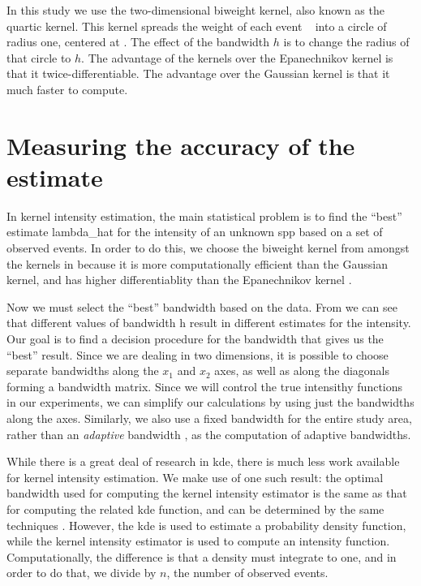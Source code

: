 In this study we use the two-dimensional biweight kernel,
also known as the quartic kernel.
This kernel spreads the weight of each event \xvec~ into a circle of radius one, centered at \xvec.
The effect of the bandwidth $h$ is to change the radius of that circle to $h$.
The advantage of the kernels over the Epanechnikov kernel is that it twice-differentiable.
The advantage over the Gaussian kernel is that it much faster to compute.

\section{Measuring the accuracy of the estimate}
\label{sec:theory:accuracy}

In \gls{kernel intensity estimation},
the main statistical problem is to find the ``best'' estimate \gls{lambda_hat}
for the \gls{intensity} of an unknown \gls{spp}
based on a set of observed \glspl{event}.
In order to do this,
we choose the biweight kernel from amongst the kernels in  because it is more computationally efficient than the Gaussian kernel,
and has higher differentiablity than the Epanechnikov kernel \citep[p. 77]{silverman1986density}.

Now we must select the ``best'' bandwidth \citep[p. 43]{silverman1986density} based on the data.
From  we can see that different values of bandwidth \gls{h} result in different estimates for the \gls{intensity}.
Our goal is to find a decision procedure for the bandwidth that gives us the ``best'' result.
Since we are dealing in two dimensions,
it is possible to choose separate bandwidths along the $x_1$ and $x_2$ axes,
as well as along the diagonals forming a bandwidth matrix.
Since we will control the true intensithy functions in our experiments,
we can simplify our calculations by using just the bandwidths along the axes.
Similarly, we also use a fixed bandwidth for the entire study area,
rather than an \textit{adaptive} bandwidth \citep{breiman1977variable},
as the computation of adaptive bandwidths.

While there is a great deal of research in \gls{kde},
there is much less work available for \gls{kernel intensity estimation}.
We make use of one such result:
the optimal bandwidth used for computing the \gls{kernel intensity estimator} is the same as that for computing the related \gls{kde} function,
and can be determined by the same techniques .
However, the \gls{kde} is used to estimate a probability density function,
while the \gls{kernel intensity estimator} is used to compute an intensity function.
Computationally, the difference is that a density must integrate to one,
and in order to do that,
we divide by $n$,
the number of observed events.



